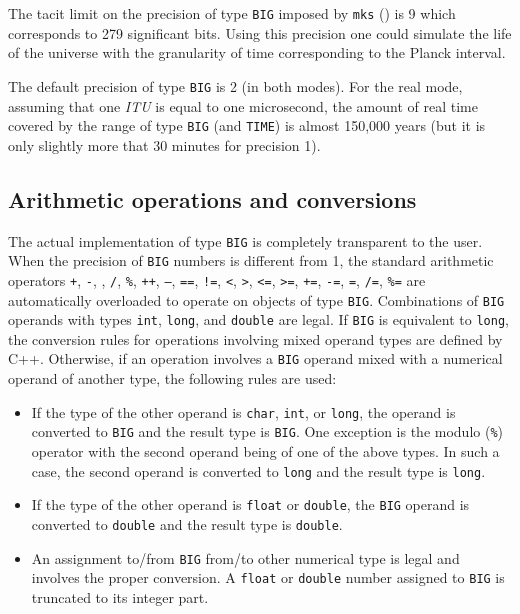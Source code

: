 The tacit limit on the precision of type {\tt BIG} imposed by {\tt mks}
() is 9 which corresponds to 279 significant bits.
Using this precision one could simulate the life of the universe with the
granularity of time corresponding to the Planck interval.

The default precision of type {\tt BIG} is 2 (in both modes).
For the real mode, assuming that one {\em ITU\/}
is equal to one microsecond, the amount of real time covered
by the range of type {\tt BIG} (and {\tt TIME}) is almost 150,000 years
(but it is only slightly more that 30 minutes for precision 1).

\subsection {Arithmetic operations and conversions}
\label {rm_mp_ao}

The actual implementation of type {\tt BIG} is completely transparent to
the user.
When the precision of {\tt BIG} numbers is different from 1, the standard
arithmetic operators {\tt +}, {\tt -}, {\tt *}, {\tt /}, {\tt \%}, {\tt ++},
{\tt --}, {\tt ==}, {\tt !=}, {\tt <}, {\tt >}, {\tt <=}, {\tt >=}, {\tt +=},
{\tt -=}, {\tt *=}, {\tt /=}, {\tt \%=} are automatically overloaded to operate
on objects of type {\tt BIG}.
Combinations of {\tt BIG} operands with types {\tt int}, {\tt long},
and {\tt double} are legal.
If {\tt BIG} is equivalent to {\tt long}, the conversion rules for operations
involving mixed operand types are defined by C++.
Otherwise, if an operation involves a {\tt BIG} operand mixed with
a numerical operand of another type, the following rules are used:
\begin{itemize}
\item
If the type of the other operand is {\tt char}, {\tt int}, or {\tt long},
the operand is converted to {\tt BIG} and the result type is {\tt BIG}.
One exception is the modulo ({\tt \%}) operator with the second operand
being of one of the above types.
In such a case, the second operand is converted to {\tt long} and the result
type is {\tt long}.
\item
If the type of the other operand is {\tt float} or {\tt double}, the {\tt BIG}
operand is converted to {\tt double} and the result type is {\tt double}.
\item
An assignment to/from {\tt BIG} from/to other numerical type is legal and
involves the proper conversion.
A {\tt float} or {\tt double} number assigned to {\tt BIG} is truncated to
its integer part.
\end{itemize}

